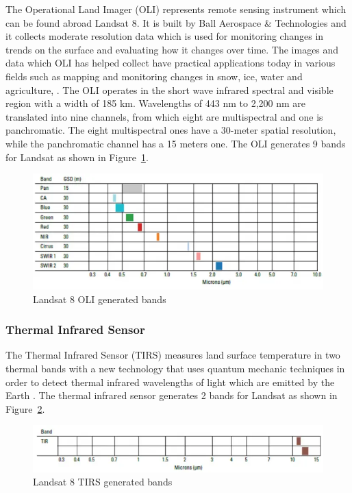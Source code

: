 \documentclass[12pt, a4paper]{report}
\begin{document}
	\par The Operational Land Imager (OLI) represents remote sensing instrument which can be found abroad Landsat 8. It is built by Ball Aerospace \& Technologies and it collects moderate resolution data which is used for monitoring changes in trends on the surface and evaluating how it changes over time. The images and data which OLI has helped collect have practical applications today in various fields such as mapping and monitoring changes in snow, ice, water and agriculture, \cite{lolidcp}. 
	The OLI operates in the short wave infrared spectral and visible region with a width of 185 km. Wavelengths of 443 nm to 2,200 nm are translated into nine channels, from which  eight are multispectral and one is panchromatic. The eight multispectral ones have a 30-meter spatial resolution, while the panchromatic channel has a 15 meters one.
	The OLI generates 9 bands for Landsat as shown in Figure~\ref{fig:L8OLI}.
	\begin{figure}[h]
		\centering
		\includegraphics[scale=0.5]{../images/Landsat8-OLI-Bands.png}
		\caption{Landsat 8 OLI generated bands \cite{l8otb}}
		\label{fig:L8OLI}
	\end{figure}
	
	\subsubsection{Thermal Infrared Sensor}
	
	\par The Thermal Infrared Sensor (TIRS) measures land surface temperature in two thermal bands with a new technology that uses quantum mechanic techniques in order to detect thermal infrared wavelengths of light which are emitted by the Earth \cite{lgng}. The thermal infrared sensor generates 2 bands for Landsat as shown in Figure~\ref{fig:L8TIRS}.
	
	\begin{figure}[h!]
		\centering
		\includegraphics[scale=0.5]{../images/Landsat8-TIRS-Bands.png}
		\caption{Landsat 8 TIRS generated bands \cite{l8otb}}
		\label{fig:L8TIRS}
	\end{figure}
	
\end{document}
